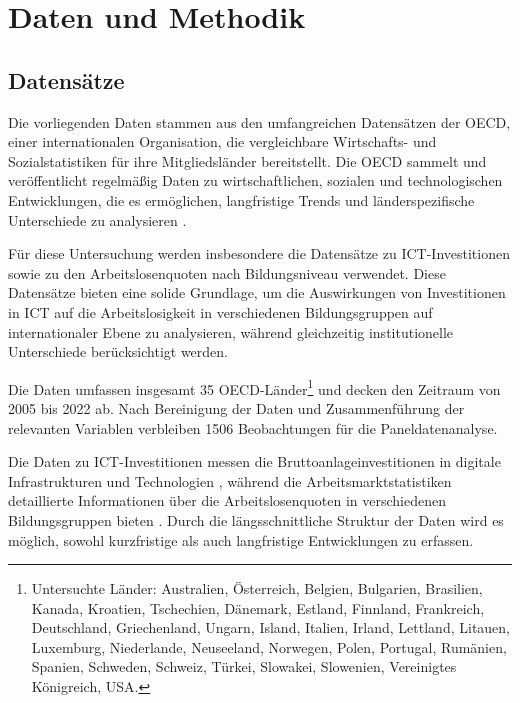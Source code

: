 

\section{Daten und Methodik}

\subsection{Datensätze}

Die vorliegenden Daten stammen aus den umfangreichen Datensätzen der \ac{OECD}, einer internationalen 
Organisation, die vergleichbare Wirtschafts- und Sozialstatistiken für ihre Mitgliedsländer bereitstellt. 
Die \ac{OECD} sammelt und veröffentlicht regelmäßig Daten zu wirtschaftlichen, sozialen und 
technologischen Entwicklungen, die es ermöglichen, langfristige Trends und länderspezifische Unterschiede 
zu analysieren \parencite{oecd2022ict}.

Für diese Untersuchung werden insbesondere die Datensätze zu \ac{ICT}-Investitionen \parencite{oecd2022ict} 
sowie zu den Arbeitslosenquoten nach Bildungsniveau \parencite{oecd2022unemployment} verwendet. 
Diese Datensätze bieten eine solide Grundlage, um die Auswirkungen von Investitionen in \ac{ICT} auf 
die Arbeitslosigkeit in verschiedenen Bildungsgruppen auf internationaler Ebene zu analysieren, während 
gleichzeitig institutionelle Unterschiede berücksichtigt werden.

Die Daten umfassen insgesamt 35 OECD-Länder\footnote{Untersuchte Länder: Australien, Österreich, Belgien, 
Bulgarien, Brasilien, Kanada, Kroatien, Tschechien, Dänemark, Estland, Finnland, Frankreich, Deutschland, 
Griechenland, Ungarn, Island, Italien, Irland, Lettland, Litauen, Luxemburg, Niederlande, 
Neuseeland, Norwegen, Polen, Portugal, Rumänien, Spanien, Schweden, Schweiz, Türkei, 
Slowakei, Slowenien, Vereinigtes Königreich, USA.} und decken den Zeitraum von 2005 bis 
2022 ab. Nach Bereinigung der Daten und Zusammenführung der relevanten Variablen verbleiben 1506 Beobachtungen 
für die Paneldatenanalyse.

Die Daten zu \ac{ICT}-Investitionen messen die Bruttoanlageinvestitionen in digitale Infrastrukturen und 
Technologien \parencite{oecd2022ict}, während die Arbeitsmarktstatistiken detaillierte Informationen über 
die Arbeitslosenquoten in verschiedenen Bildungsgruppen bieten \parencite{oecd2022unemployment}. Durch die 
längsschnittliche Struktur der Daten wird es möglich, sowohl kurzfristige als auch langfristige 
Entwicklungen zu erfassen.

